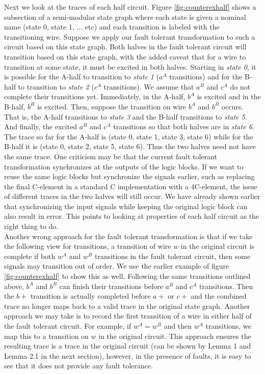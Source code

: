 \documentclass[12pt]{report}
\begin{document}
Next we look at the traces of each half circuit.  Figure \ref{fig:counterexhalf} shows a subsection of a semi-modular state graph where each state is given a nominal name (state 0, state 1, ... etc) and each transition is labeled with the transitioning wire.  Suppose we apply our fault tolerant transformation to such a circuit based on this state graph.  Both halves in the fault tolerant circuit will transition based on this state graph, with the added caveat that for a wire to transition at some state, it must be excited in both halves.  Starting in {\em state 0}, it is possible for the A-half to transition to {\em state 1} ($a^A$ transitions) and for the B-half to transition to {\em state 2} ($c^A$ transitions).  We assume that $a^B$ and $c^A$ do not complete their transitions yet.  Immediately, in the A-half, $b^A$ is excited and in the B-half, $b^B$ is excited.  Then, suppose the transition on wire $b^A$ and $b^B$ occurs.  That is, the A-half transitions to {\em state 3} and the B-half transitions to {\em state 5}.  And finally, the excited $a^B$ and $c^A$ transitions so that both halves are in {\em state 6}.  The trace so far for the A-half is (state 0, state 1, state 3, state 6) while for the B-half it is (state 0, state 2, state 5, state 6).  Thus the two halves need not have the same trace.  One criticism may be that the current fault tolerant transformation synchronizes at the outputs of the logic blocks.  If we want to reuse the same logic blocks but synchronize the signals earlier, such as replacing the final C-element in a standard C implementation with a 4C-element, the issue of different traces in the two halves will still occur.  We have already shown earlier that synchronizing the input signals while keeping the original logic block can also result in error.  This points to looking at properties of each half circuit as the right thing to do.\\ 

Another wrong approach for the fault tolerant transformation is that if we take the following view for transitions, a transition of wire $w$ in the original circuit is complete if both $w^A$ and $w^B$ transitions in the fault tolerant circuit, then some signals may transition out of order.  We use the earlier example of figure \ref{fig:counterexhalf} to show this as well.  Following the same transitions outlined above, $b^A$ and $b^B$ can finish their transitions before $a^B$ and $c^A$ transitions.  Then the $b+$ transition is actually completed before $a+$ or $c+$ and the combined trace no longer maps back to a valid trace in the original state graph.  Another approach we may take is to record the first transition of a wire in either half of the fault tolerant circuit.  For example, if $w^A=w^B$ and then $w^A$ transitions, we map this to a transition on $w$ in the original circuit.  This approach ensures the resulting trace is a trace in the original circuit (can be shown by Lemma 1 and Lemma 2.1 in the next section), however, in the presence of faults, it is easy to see that it does not provide any fault tolerance.\\
\end{document}
